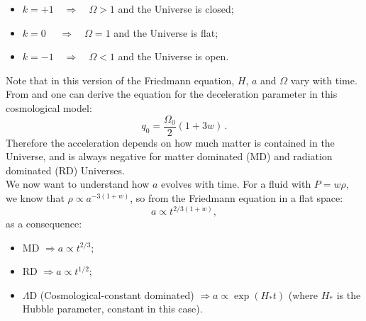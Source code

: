 \begin{itemize}
\item $k=+1$$ \quad \Rightarrow \quad \Omega>1$ and the Universe is closed;
\item $k=0$ $ \quad \Rightarrow \quad \Omega=1$ and the Universe is flat;
\item $k=-1$$ \quad \Rightarrow \quad \Omega<1$ and the Universe is open.
\end{itemize}
Note that in this version of the Friedmann equation, $H$, $a$ and $\Omega$ vary with time.\\
From  and  one can derive the equation for the deceleration parameter in this cosmological model:
\begin{equation}
q_0 = \frac{\Omega_0}{2} (1+3w)\,. \label{q0}
\end{equation}
Therefore the acceleration depends on how much matter is contained in the Universe, and is always negative for matter dominated (MD) and radiation dominated (RD) Universes.\\

We now want to understand how $a$ evolves with time. For a fluid with $P=w\rho$, we know that $\rho \propto a^{-3(1+w)}$, so from the Friedmann equation in a flat space:
\begin{equation}
a \propto t^{2/3(1+w)},\label{R}
\end{equation}as a consequence:
\begin{itemize}
\item  MD $\Rightarrow a \propto t^{2/3}$;
\item  RD $\Rightarrow a \propto t^{1/2}$;
\item  $\Lambda$D (Cosmological-constant dominated) $\Rightarrow a \propto \exp{(H_*t)}$ (where $H_*$ is the Hubble parameter, constant in this case).
\end{itemize}

